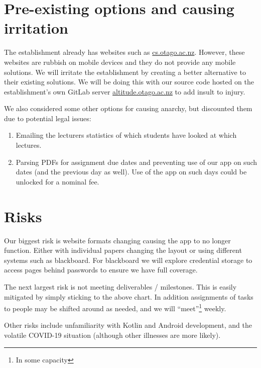 \documentclass{article}
\begin{document}
	\section{Pre-existing options and causing irritation}
	
	The establishment already has websites such as \url{cs.otago.ac.nz}. However, these websites are rubbish on mobile devices and they do not provide any mobile solutions. We will irritate the establishment by creating a better alternative to their existing solutions. We will be doing this with our source code hosted on the establishment's own GitLab server \url{altitude.otago.ac.nz} to add insult to injury.
	
	We also considered some other options for causing anarchy, but discounted them due to potential legal issues:
	
	\begin{enumerate}
		\item Emailing the lecturers statistics of which students have looked at which lectures.
		\item Parsing PDFs for assignment due dates and preventing use of our app on such dates (and the previous day as well). Use of the app on such days could be unlocked for a nominal fee.
	\end{enumerate}
	
	\section{Risks}
	
	Our biggest risk is website formats changing causing the app to no longer function. Either with individual papers changing the layout or using different systems such as blackboard. For blackboard we will explore credential storage to access pages behind passwords to ensure we have full coverage.
	
	The next largest risk is not meeting deliverables / milestones. This is easily mitigated by simply sticking to the above chart. In addition assignments of tasks to people may be shifted around as needed, and we will ``meet''\footnote{In some capacity} weekly.
	
	Other risks include unfamiliarity with Kotlin and Android development, and the volatile COVID-19 situation (although other illnesses are more likely).
\end{document}
